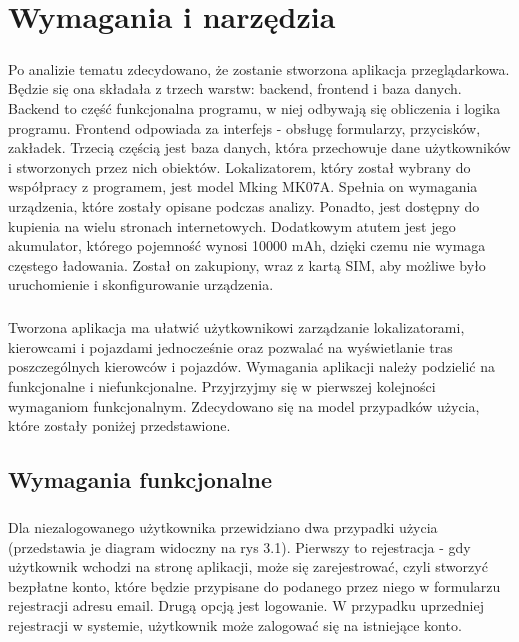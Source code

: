 \chapter{Wymagania i narzędzia}
\label{ch:wymagania-i-narzedzia}

\paragraph{}
Po analizie tematu zdecydowano, że zostanie stworzona aplikacja przeglądarkowa. Będzie się ona składała z trzech warstw: backend, frontend i baza danych. Backend to część funkcjonalna programu, w niej odbywają się obliczenia i logika programu. Frontend odpowiada za interfejs - obsługę formularzy, przycisków, zakładek. Trzecią częścią jest baza danych, która przechowuje dane użytkowników i stworzonych przez nich obiektów. Lokalizatorem, który został wybrany do współpracy z programem, jest model Mking MK07A. Spełnia on wymagania urządzenia, które zostały opisane podczas analizy. Ponadto, jest dostępny do kupienia na wielu stronach internetowych. Dodatkowym atutem jest jego akumulator, którego pojemność wynosi 10000 mAh, dzięki czemu nie wymaga częstego ładowania. Został on zakupiony, wraz z kartą SIM, aby możliwe było uruchomienie i skonfigurowanie urządzenia.

\paragraph{}
Tworzona aplikacja ma ułatwić użytkownikowi zarządzanie lokalizatorami, kierowcami i pojazdami jednocześnie oraz pozwalać na wyświetlanie tras poszczególnych kierowców i pojazdów. Wymagania aplikacji należy podzielić na funkcjonalne i niefunkcjonalne. Przyjrzyjmy się w pierwszej kolejności wymaganiom funkcjonalnym. Zdecydowano się na model przypadków użycia, które zostały poniżej przedstawione.

\section{Wymagania funkcjonalne}
\paragraph{}
Dla niezalogowanego użytkownika przewidziano dwa przypadki użycia (przedstawia je diagram widoczny na rys 3.1). Pierwszy to  rejestracja - gdy użytkownik wchodzi na stronę aplikacji, może się zarejestrować, czyli stworzyć bezpłatne konto, które będzie przypisane do podanego przez niego w formularzu rejestracji adresu email. Drugą opcją jest  logowanie. W przypadku uprzedniej rejestracji w systemie, użytkownik może zalogować się na istniejące konto.


